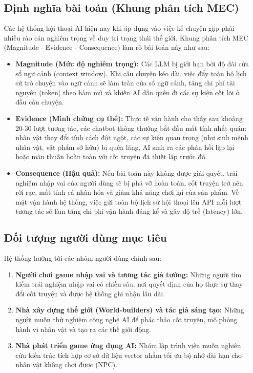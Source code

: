 \documentclass[a4paper]{article}
\begin{document}
\begin{titlepage}
\subsection{Định nghĩa bài toán (Khung phân tích MEC)}
Các hệ thống hội thoại AI hiện nay khi áp dụng vào việc kể chuyện gặp phải nhiều rào cản nghiêm trọng về duy trì trạng thái thế giới. Khung phân tích MEC (Magnitude - Evidence - Consequence) làm rõ bài toán này như sau:

\begin{itemize}
    \item \textbf{Magnitude (Mức độ nghiêm trọng):} Các LLM bị giới hạn bởi độ dài cửa sổ ngữ cảnh (context window). Khi câu chuyện kéo dài, việc đẩy toàn bộ lịch sử trò chuyện vào ngữ cảnh sẽ làm tràn cửa sổ ngữ cảnh, tăng chi phí tài nguyên (token) theo hàm mũ và khiến AI dần quên đi các sự kiện cốt lõi ở đầu câu chuyện.
    \item \textbf{Evidence (Minh chứng cụ thể):} Thực tế vận hành cho thấy sau khoảng 20-30 lượt tương tác, các chatbot thông thường bắt đầu mất tính nhất quán: nhân vật thay đổi tính cách đột ngột, các sự kiện quan trọng (như sinh mệnh nhân vật, vật phẩm sở hữu) bị quên lãng, AI sinh ra các phản hồi lặp lại hoặc mâu thuẫn hoàn toàn với cốt truyện đã thiết lập trước đó.
    \item \textbf{Consequence (Hậu quả):} Nếu bài toán này không được giải quyết, trải nghiệm nhập vai của người dùng sẽ bị phá vỡ hoàn toàn, cốt truyện trở nên rời rạc, mất tính cá nhân hóa và giảm khả năng chơi lại của sản phẩm. Về mặt vận hành hệ thống, việc gửi toàn bộ lịch sử hội thoại lên API mỗi lượt tương tác sẽ làm tăng chi phí vận hành đáng kể và gây độ trễ (latency) lớn.
\end{itemize}

\subsection{Đối tượng người dùng mục tiêu}
Hệ thống hướng tới các nhóm người dùng chính sau:
\begin{enumerate}
    \item \textbf{Người chơi game nhập vai và tương tác giả tưởng:} Những người tìm kiếm trải nghiệm nhập vai có chiều sâu, nơi quyết định của họ thực sự thay đổi cốt truyện và được hệ thống ghi nhận lâu dài.
    \item \textbf{Nhà xây dựng thế giới (World-builders) và tác giả sáng tạo:} Những người muốn thử nghiệm công nghệ AI để phác thảo cốt truyện, mô phỏng hành vi nhân vật và tạo ra các thế giới động.
    \item \textbf{Nhà phát triển game ứng dụng AI:} Nhóm lập trình viên muốn nghiên cứu kiến trúc tích hợp cơ sở dữ liệu vector nhằm tối ưu bộ nhớ dài hạn cho nhân vật không chơi được (NPC).
\end{enumerate}


\end{titlepage}
\end{document}
